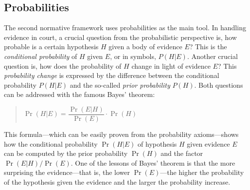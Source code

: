 \documentclass[10pt]{article}
\begin{document}
\subsection{Probabilities}
The second normative framework %
uses probabilities as the main tool. 
In handling evidence in court, a crucial question from the probabilistic perspective is, 
how probable is a certain hypothesis $H$ given a body of evidence $E$? This is 
the \textit{conditional probability} of $H$ given $E$, or in symbols, $P(H|E)$. 
Another crucial question is, how does the probability of $H$ 
change in light of evidence $E$? This \textit{probability change} is expressed by 
the difference between the conditional probability $P(H|E)$ and the so-called \textit{prior 
probability} $P(H)$.
Both questions can be addressed with 
the famous Bayes' theorem:
%
\begin{quotation}
	$\Pr(H|E) = \dfrac{\Pr(E|H)}{\Pr(E)}\cdot\Pr(H)$
\end{quotation}
%
This formula---which can be easily proven from 
the probability axioms---shows how the 
conditional probability $\Pr(H|E)$ of hypothesis $H$ given evidence $E$ 
can be computed by the prior probability $\Pr(H)$ and the 
factor $\Pr(E|H)/\Pr(E)$.  One of the lessons of Bayes' theorem is that the more surprising 
the evidence---that is, the lower $\Pr(E)$---the higher the probability 
of the hypothesis given the evidence and the larger the probability increase. 

\end{document}
